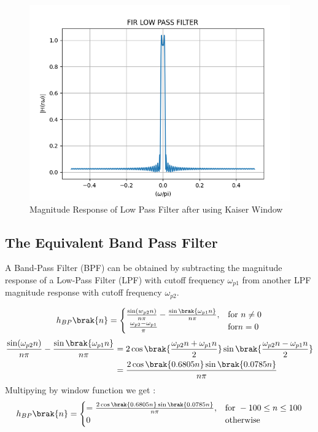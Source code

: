 \documentclass{article}
\begin{document}
\begin{figure}[H]
    \centering
    \includegraphics[width=1\columnwidth]{figs/FIR_Low_Filter.png}
    \caption{Magnitude Response of Low Pass Filter after using Kaiser Window}
    \label{fig:Kaiser_LPF_response}
\end{figure}

\subsection{The Equivalent Band Pass Filter}
A Band-Pass Filter (BPF) can be obtained by subtracting the magnitude response of a Low-Pass Filter (LPF) with cutoff frequency $\omega_{p1}$ from another LPF magnitude response with cutoff frequency $\omega_{p2}$.

\begin{align}
    h_{BP}\brak{n} = 
    \begin{cases} 
        \frac{\sin(w_{p2} n)}{n\pi} -\frac{\sin\brak{\omega_{p1}n}}{n\pi}, & \text{for } n\neq 0 \\\
        \frac{\omega_{p2}-\omega_{p1}}{\pi}                                & \text{for} n= 0
    \end{cases} \label{eq:h(n)desired_for_LPF}
\end{align}
\begin{align}
    \frac{\sin(\omega_{p2} n)}{n\pi} -\frac{\sin\brak{\omega_{p1}n}}{n\pi} & = 2\cos{\brak{\frac{\omega_{p2}n+\omega_{p1}n}{2}}}\sin{\brak{\frac{\omega_{p2}n-\omega_{p1}n}{2}}} \\
                                                                           & = \frac{2\cos{\brak{0.6805n}}\sin{\brak{0.0785n}}}{n\pi}
\end{align}
Multipying by window function we get :
\begin{align}
    h_{BP}\brak{n} = 
    \begin{cases} 
        = \frac{2\cos{\brak{0.6805n}}\sin{\brak{0.0785n}}}{n\pi}, & \text{for } -100\leq n \leq 100 \\
        0                                                           & \text{otherwise}
    \end{cases} \label{eq:h(n)desired_for_LPF}
\end{align}
\end{document}
